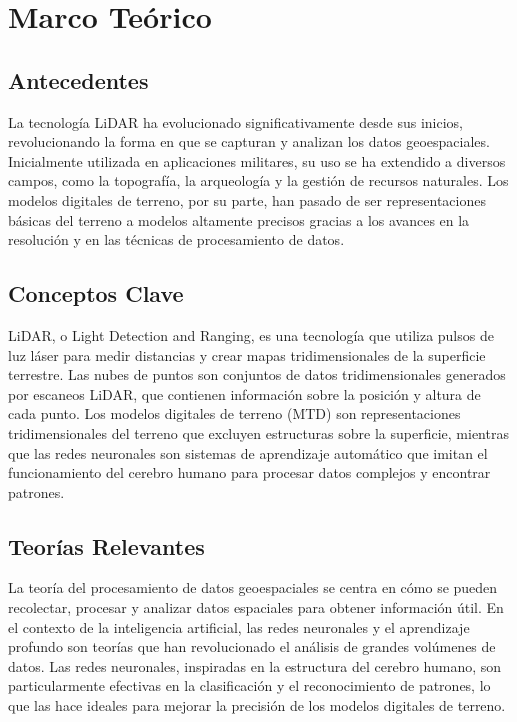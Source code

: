 \section{Marco Teórico}

\subsection{Antecedentes}
La tecnología LiDAR ha evolucionado significativamente desde sus inicios, revolucionando la forma en que se capturan y analizan los datos geoespaciales. Inicialmente utilizada en aplicaciones militares, su uso se ha extendido a diversos campos, como la topografía, la arqueología y la gestión de recursos naturales. Los modelos digitales de terreno, por su parte, han pasado de ser representaciones básicas del terreno a modelos altamente precisos gracias a los avances en la resolución y en las técnicas de procesamiento de datos.
\espacio

\subsection{Conceptos Clave}
LiDAR, o Light Detection and Ranging, es una tecnología que utiliza pulsos de luz láser para medir distancias y crear mapas tridimensionales de la superficie terrestre. Las nubes de puntos son conjuntos de datos tridimensionales generados por escaneos LiDAR, que contienen información sobre la posición y altura de cada punto. Los modelos digitales de terreno (MTD) son representaciones tridimensionales del terreno que excluyen estructuras sobre la superficie, mientras que las redes neuronales son sistemas de aprendizaje automático que imitan el funcionamiento del cerebro humano para procesar datos complejos y encontrar patrones.
\espacio

\subsection{Teorías Relevantes}
La teoría del procesamiento de datos geoespaciales se centra en cómo se pueden recolectar, procesar y analizar datos espaciales para obtener información útil. En el contexto de la inteligencia artificial, las redes neuronales y el aprendizaje profundo son teorías que han revolucionado el análisis de grandes volúmenes de datos. Las redes neuronales, inspiradas en la estructura del cerebro humano, son particularmente efectivas en la clasificación y el reconocimiento de patrones, lo que las hace ideales para mejorar la precisión de los modelos digitales de terreno.
\espacio

